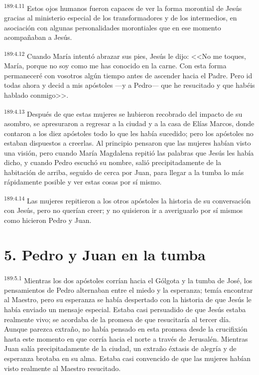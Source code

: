 \par 
\textsuperscript{189:4.11} Estos ojos humanos fueron capaces de ver la forma morontial de Jesús gracias al ministerio especial de los transformadores y de los intermedios, en asociación con algunas personalidades morontiales que en ese momento acompañaban a Jesús.

\par 
\textsuperscript{189:4.12} Cuando María intentó abrazar sus pies, Jesús le dijo: <<No me toques, María, porque no soy como me has conocido en la carne. Con esta forma permaneceré con vosotros algún tiempo antes de ascender hacia el Padre. Pero id todas ahora y decid a mis apóstoles ---y a Pedro--- que he resucitado y que habéis hablado conmigo>>.

\par 
\textsuperscript{189:4.13} Después de que estas mujeres se hubieron recobrado del impacto de su asombro, se apresuraron a regresar a la ciudad y a la casa de Elías Marcos, donde contaron a los diez apóstoles todo lo que les había sucedido; pero los apóstoles no estaban dispuestos a creerlas. Al principio pensaron que las mujeres habían visto una visión, pero cuando María Magdalena repitió las palabras que Jesús les había dicho, y cuando Pedro escuchó su nombre, salió precipitadamente de la habitación de arriba, seguido de cerca por Juan, para llegar a la tumba lo más rápidamente posible y ver estas cosas por sí mismo.

\par 
\textsuperscript{189:4.14} Las mujeres repitieron a los otros apóstoles la historia de su conversación con Jesús, pero no querían creer; y no quisieron ir a averiguarlo por sí mismos como hicieron Pedro y Juan.

\section*{5. Pedro y Juan en la tumba}
\par 
\textsuperscript{189:5.1} Mientras los dos apóstoles corrían hacia el Gólgota y la tumba de José, los pensamientos de Pedro alternaban entre el miedo y la esperanza; temía encontrar al Maestro, pero su esperanza se había despertado con la historia de que Jesús le había enviado un mensaje especial. Estaba casi persuadido de que Jesús estaba realmente vivo; se acordaba de la promesa de que resucitaría al tercer día. Aunque parezca extraño, no había pensado en esta promesa desde la crucifixión hasta este momento en que corría hacia el norte a través de Jerusalén. Mientras Juan salía precipitadamente de la ciudad, un extraño éxtasis de alegría y de esperanza brotaba en su alma. Estaba casi convencido de que las mujeres habían visto realmente al Maestro resucitado.


